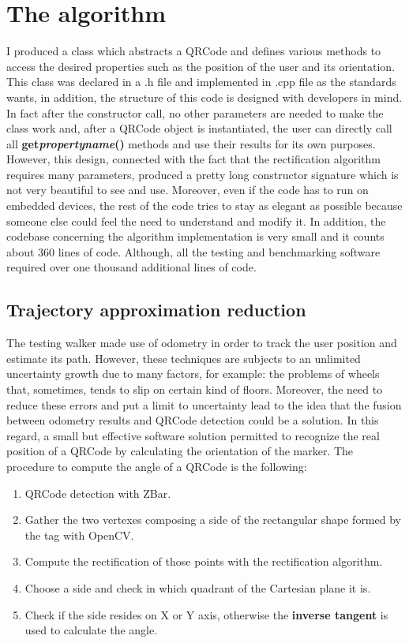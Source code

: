 \chapter{The algorithm}

I produced a class which abstracts a QRCode and defines various methods to access the desired properties such as the position of the user and its orientation. This class was declared in a .h file and implemented in .cpp file as the standards wants, in addition, the structure of this code is designed with developers in mind. In fact after the constructor call, no other parameters are needed to make the class work and, after a QRCode object is instantiated, the user can directly call all \textbf{get\textunderscore{}\emph{propertyname}()} methods and use their results for its own purposes. However, this design, connected with the fact that the rectification algorithm requires many parameters, produced a pretty long constructor signature which is not very beautiful to see and use. Moreover, even if the code has to run on embedded devices, the rest of the code tries to stay as elegant as possible because someone else could feel the need to understand and modify it.
In addition, the codebase concerning the algorithm implementation is very small and it counts about 360 lines of code. Although, all the testing and benchmarking software required over one thousand additional lines of code.

\section{Trajectory approximation reduction}
The testing walker made use of odometry in order to track the user position and estimate its path. However, these techniques are subjects to an unlimited uncertainty growth due to many factors, for example: the problems of wheels that, sometimes, tends to slip on certain kind of floors. Moreover, the need to reduce these errors and put a limit to uncertainty lead to the idea that the fusion between odometry results and QRCode detection could be a solution. In this regard, a small but effective software solution permitted to recognize the real position of a QRCode by calculating the orientation of the marker.
The procedure to compute the angle of a QRCode is the following:
\begin{enumerate}
	\item QRCode detection with ZBar.
	\item Gather the two vertexes composing a side of the rectangular shape formed by the tag with OpenCV.
	\item Compute the rectification of those points with the rectification algorithm.
	\item Choose a side and check in which quadrant of the Cartesian plane it is.
	\item Check if the side resides on X or Y axis, otherwise the \textbf{inverse tangent} is used to calculate the angle.   
\end{enumerate}

